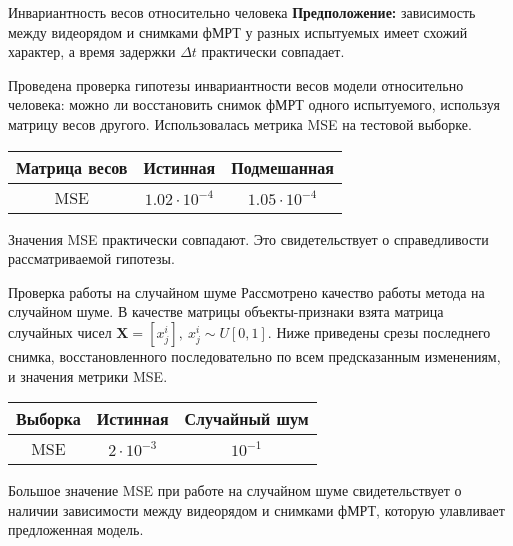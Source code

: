 \documentclass[10pt]{beamer}
\begin{document}
\begin{frame}{Инвариантность весов относительно человека}
    \textbf{Предположение:} зависимость между видеорядом и снимками фМРТ у разных испытуемых
    имеет схожий характер, а время задержки $\Delta t$ практически совпадает.

    Проведена проверка гипотезы инвариантности весов модели относительно человека:
	можно ли восстановить снимок фМРТ одного испытуемого, используя
	матрицу весов другого. Использовалась метрика MSE на тестовой выборке.
    \begin{table}[h!]
		\centering
		\begin{tabular}{|c|c|c|}
			\hline
			Матрица весов	&	Истинная	&	Подмешанная\footnotemark[1] \\ \hline \hline
			MSE		& 	$1.02 \cdot 10^{-4}$	 &		$1.05 \cdot 10^{-4}$ \\ \hline
		\end{tabular}
		\label{table:1}
	\end{table}
    Значения MSE практически совпадают. Это свидетельствует о справедливости рассматриваемой гипотезы. 
\end{frame}
\begin{frame}{Проверка работы на случайном шуме}
    Рассмотрено качество работы метода на случайном шуме. В качестве матрицы объекты-признаки
	взята матрица случайных чисел $\mathbf{X} = [x^i_j], \ x^i_j \sim U[0, 1]$. 
    Ниже приведены срезы последнего снимка, восстановленного
    последовательно по всем предсказанным изменениям, и значения метрики MSE.
    \vspace{-0.5cm}
	\begin{figure}[h!]
		\centering
		\hfill
		\hfill
		\label{fig:8}
	\end{figure}
    \vspace{-0.2cm}
    \begin{table}[h!]
		\centering
		\begin{tabular}{|c|c|c|}
			\hline
			Выборка	&	Истинная	&	Случайный шум \\ \hline \hline
			MSE		& 	$2 \cdot 10^{-3}$	 &		$10^{-1}$ \\ \hline
		\end{tabular}
		\label{table:2}
	\end{table}
    Большое значение MSE при работе на случайном шуме свидетельствует о наличии зависимости 
    между видеорядом и снимками фМРТ, которую улавливает предложенная модель. 
\end{frame}
\end{document}
